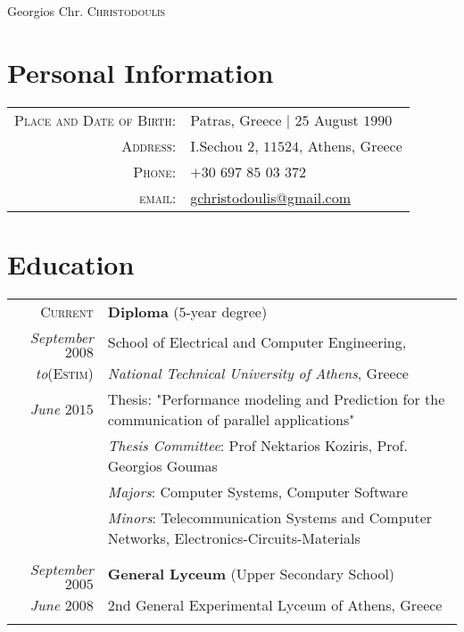 \documentclass[a4paper,10pt]{article}
\begin{document}
\pagestyle{plain} %



\par{\centering
		{\Huge Georgios Chr. \textsc{Christodoulis}
	}\bigskip\par}


\section{Personal Information}

\begin{tabular}{rl}
    \textsc{Place and Date of Birth:} & Patras, Greece  | $25$ August $1990$ \\
    \textsc{Address:}   & I.Sechou $2$, $11524$, Athens, Greece \\
    \textsc{Phone:}     & $+30$ $697$ $85$ $03$ $372$\\
    \textsc{email:}     & \href{mailto:gchristodoulis@gmail.com}{gchristodoulis@gmail.com}
\end{tabular}

\section{Education}
\begin{tabular}[l]{r|p{1400pt}}	
\textsc{Current} & \textbf{Diploma }($5$-year degree)\\
\textit{September $2008$} & School of Electrical and Computer Engineering,\\
\textit{to}\textsc{(Estim)} &\normalsize\emph {National Technical University of Athens}, Greece\\
\textit{June $2015$} &Thesis: "Performance modeling and Prediction for the communication of parallel applications"\\
&\emph{Thesis Committee}: Prof Nektarios Koziris, Prof. Georgios Goumas\\
&\emph{Majors}: Computer Systems, Computer Software\\
&\emph{Minors}: Telecommunication Systems and Computer Networks, Electronics-Circuits-Materials\\\multicolumn{2}{c}{} \\
\textit{September $2005$} & \textbf{General Lyceum }(Upper Secondary School)\\
\textit{June $2008$} & 2nd General Experimental Lyceum of Athens, Greece\\\multicolumn{2}{c}{}
\end{tabular}
\end{document}
